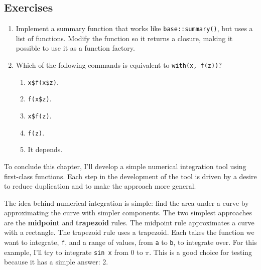 \subsection{Exercises}

\begin{enumerate}
\def\labelenumi{\arabic{enumi}.}
\item
  Implement a summary function that works like \texttt{base::summary()},
  but uses a list of functions. Modify the function so it returns a
  closure, making it possible to use it as a function factory.
\item
  Which of the following commands is equivalent to
  \texttt{with(x, f(z))}?

  \begin{enumerate}
  \def\labelenumii{(\alph{enumii})}
  \itemsep1pt\parskip0pt
  \item
    \texttt{x\$f(x\$z)}.
  \item
    \texttt{f(x\$z)}.
  \item
    \texttt{x\$f(z)}.
  \item
    \texttt{f(z)}.
  \item
    It depends.
  \end{enumerate}
\end{enumerate}


To conclude this chapter, I'll develop a simple numerical integration
tool using first-class functions. Each step in the development of the
tool is driven by a desire to reduce duplication and to make the
approach more general. 

The idea behind numerical integration is simple: find the area under a
curve by approximating the curve with simpler components. The two
simplest approaches are the \textbf{midpoint} and \textbf{trapezoid}
rules. The midpoint rule approximates a curve with a rectangle. The
trapezoid rule uses a trapezoid. Each takes the function we want to
integrate, \texttt{f}, and a range of values, from \texttt{a} to
\texttt{b}, to integrate over. For this example, I'll try to integrate
\texttt{sin x} from 0 to $\pi$. This is a good choice for testing
because it has a simple answer: 2.

